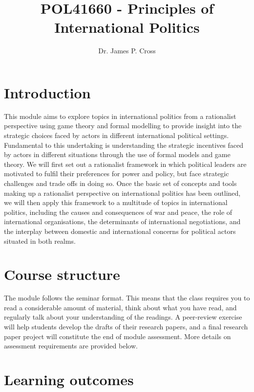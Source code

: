 \documentclass[12pt,a4paper]{article}
\title{POL41660 - Principles of International Politics}
\date{}
\author{Dr. James P. Cross}
\begin{document}
\ifpdf
{}
\else
{}
\fi
\maketitle


\thispagestyle{empty}
\clearpage

\section*{Introduction}

This module aims to explore topics in international politics from a rationalist perspective using game theory and formal modelling to provide insight into the strategic choices faced by actors in different international political settings. Fundamental to this undertaking is understanding the strategic incentives faced by actors in different situations through the use of formal models and game theory. We will first set out a rationalist framework in which political leaders are motivated to fulfil their preferences for power and policy, but face strategic challenges and trade offs in doing so. Once the basic set of concepts and tools making up a rationalist perspective on international politics has been outlined, we will then apply this framework to a multitude of topics in international politics, including the causes and consequences of war and peace, the role of international organisations, the determinants of international negotiations, and the interplay between domestic and international concerns for political actors situated in both realms.

\section*{Course structure}

The module follows the seminar format. This means that the class requires you to read a considerable amount of material, think about what you have read, and regularly talk about your understanding of the readings. A peer-review exercise will help students develop the drafts of their research papers, and a final research paper project will constitute the end of module assessment. More details on assessment requirements are provided below.

\section*{Learning outcomes}
\end{document}
